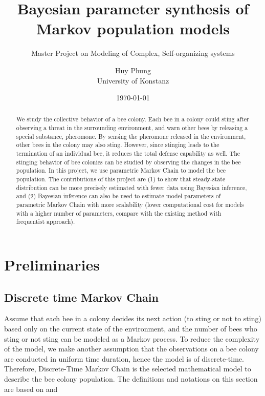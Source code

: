 \documentclass[12pt]{article}
\title{Bayesian parameter synthesis of Markov population models}
\subtitle{Master Project on Modeling of Complex, Self-organizing systems}
\author{Huy Phung\\University of Konstanz}
\date{\today}
\theoremstyle{definition}
\begin{document}
\maketitle
\pagebreak
\tableofcontents
\pagebreak

\begin{abstract}
  We study the collective behavior of a bee colony. Each bee in a colony could
  sting after observing a threat in the surrounding environment, and warn other
  bees by releasing a special substance, pheromone. By sensing the pheromone
  released in the environment, other bees in the colony may also sting. However,
  since stinging leads to the termination of an individual bee, it reduces the
  total defense capability as well. The stinging behavior of bee colonies can be
  studied by observing the changes in the bee population. In this project, we
  use parametric Markov Chain to model the bee population. The contributions of
  this project are (1) to show that steady-state distribution can be more
  precisely estimated with fewer data using Bayesian inference, and (2) Bayesian
  inference can also be used to estimate model parameters of parametric Markov
  Chain with more scalability (lower computational cost for models with a higher
  number of parameters, compare with the existing method with frequentist
  approach).
\end{abstract}

\section{Preliminaries}
\subsection{Discrete time Markov Chain}
Assume that each bee in a colony decides its next action (to sting or not to
sting) based only on the current state of the environment, and the number of
bees who sting or not sting can be modeled as a Markov process. To reduce the
complexity of the model, we make another assumption that the observations on a
bee colony are conducted in uniform time duration, hence the model is of
discrete-time. Therefore, Discrete-Time Markov Chain is the selected
mathematical model to describe the bee colony population. The definitions and
notations on this section are based on \cite{baier2008principles} and \cite{hajnal2019data}
\end{document}
